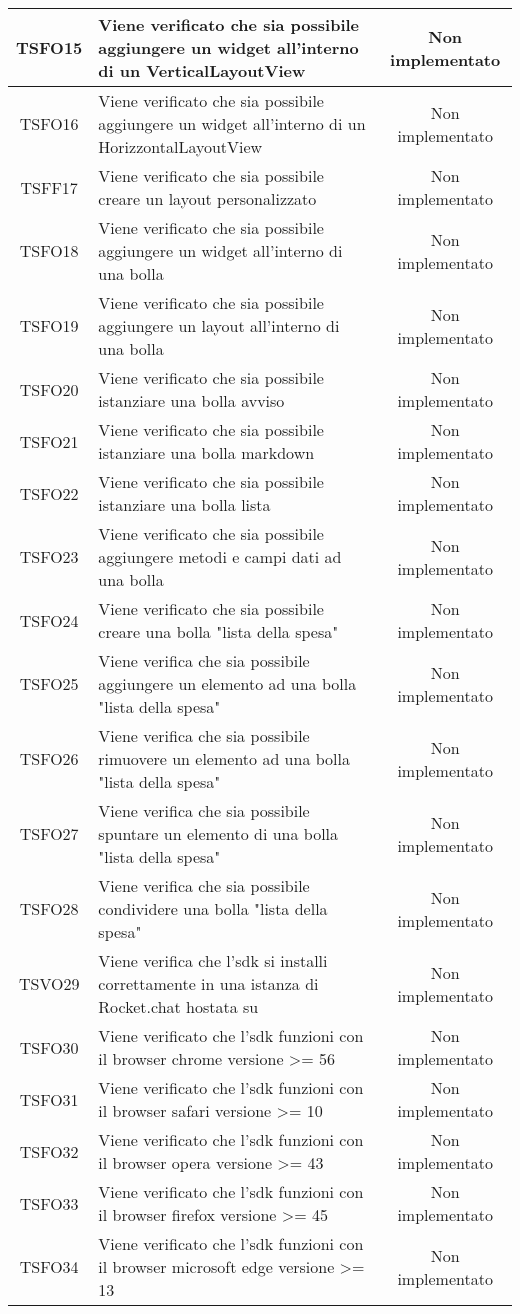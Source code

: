 \begin{center}
\begin{longtable}{|c|>{\centering}m{10cm}|c|}
		TSFO15 & Viene verificato che sia possibile aggiungere un widget all'interno di un VerticalLayoutView & Non implementato \\ \hline
		TSFO16 & Viene verificato che sia possibile aggiungere un widget all'interno di un HorizzontalLayoutView & Non implementato \\ \hline
		TSFF17 & Viene verificato che sia possibile creare un layout personalizzato & Non implementato \\ \hline
		TSFO18 & Viene verificato che sia possibile aggiungere un widget all'interno di una bolla & Non implementato \\ \hline
		TSFO19 & Viene verificato che sia possibile aggiungere un layout all'interno di una bolla & Non implementato \\ \hline
		TSFO20 & Viene verificato che sia possibile istanziare una bolla avviso & Non implementato \\ \hline
		TSFO21 & Viene verificato che sia possibile istanziare una bolla markdown & Non implementato \\ \hline
		TSFO22 & Viene verificato che sia possibile istanziare una bolla lista & Non implementato \\ \hline
		TSFO23 & Viene verificato che sia possibile aggiungere metodi e campi dati ad una bolla & Non implementato \\ \hline
		TSFO24 & Viene verificato che sia possibile creare una bolla "lista della spesa" & Non implementato \\ \hline
		TSFO25 & Viene verifica che sia possibile aggiungere un elemento ad una bolla "lista della spesa" & Non implementato \\ \hline
		TSFO26 & Viene verifica che sia possibile rimuovere un elemento ad una bolla "lista della spesa" & Non implementato \\ \hline
		TSFO27 & Viene verifica che sia possibile spuntare un elemento di una bolla "lista della spesa" & Non implementato \\ \hline
		TSFO28 & Viene verifica che sia possibile condividere una bolla "lista della spesa" & Non implementato \\ \hline
		TSVO29 & Viene verifica che l'sdk si installi correttamente in una istanza di Rocket.chat hostata su \termine{Heroku} & Non implementato \\ \hline
		TSFO30 & Viene verificato che l'sdk funzioni con il browser chrome versione >= 56 & Non implementato \\ \hline
		TSFO31 & Viene verificato che l'sdk funzioni con il browser safari versione >= 10 & Non implementato \\ \hline
		TSFO32 & Viene verificato che l'sdk funzioni con il browser opera versione >= 43 & Non implementato \\ \hline
		TSFO33 & Viene verificato che l'sdk funzioni con il browser firefox versione >= 45 & Non implementato \\ \hline
		TSFO34 & Viene verificato che l'sdk funzioni con il browser microsoft edge versione >= 13 & Non implementato \\ \hline
	\end{longtable}
\end{center}
